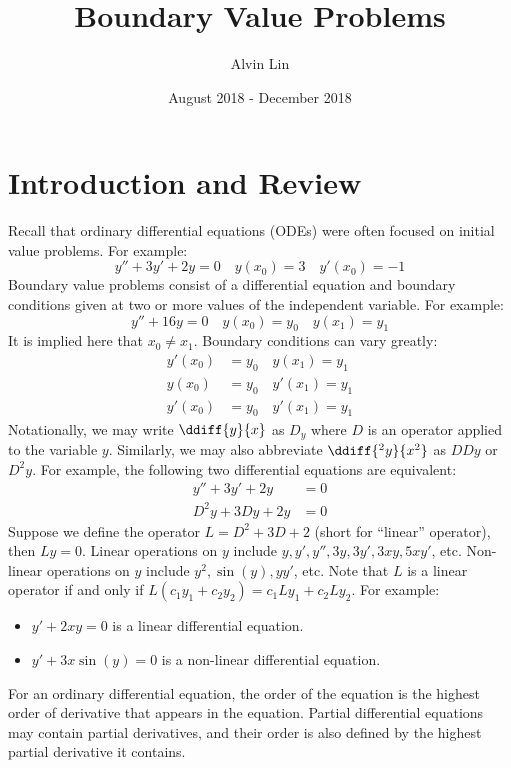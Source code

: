 \documentclass{math}
\title{Boundary Value Problems}
\author{Alvin Lin}
\date{August 2018 - December 2018}
\begin{document}
\maketitle

\section*{Introduction and Review}
Recall that ordinary differential equations (ODEs) were often focused on
initial value problems. For example:
\[ y''+3y'+2y = 0 \quad y(x_0) = 3 \quad y'(x_0) = -1 \]
Boundary value problems consist of a differential equation and boundary
conditions given at two or more values of the independent variable. For example:
\[ y''+16y = 0 \quad y(x_0) = y_0 \quad y(x_1) = y_1 \]
It is implied here that \( x_0 \ne x_1 \). Boundary conditions can vary greatly:
\begin{align*}
  y'(x_0) &= y_0 \quad y(x_1) = y_1 \\
  y(x_0) &= y_0 \quad y'(x_1) = y_1 \\
  y'(x_0) &= y_0 \quad y'(x_1) = y_1
\end{align*}
Notationally, we may write \( \ddiff{y}{x} \) as \( D_y \) where \( D \) is an
operator applied to the variable \( y \). Similarly, we may also abbreviate
\( \ddiff{^2y}{x^2} \) as \( DDy \) or \( D^2y \). For example, the following
two differential equations are equivalent:
\begin{align*}
  y''+3y'+2y &= 0 \\
  D^2y+3Dy+2y &= 0
\end{align*}
Suppose we define the operator \( L = D^2+3D+2 \) (short for ``linear''
operator), then \( Ly = 0 \). Linear operations on \( y \) include
\( y, y', y'', 3y, 3y', 3xy, 5xy' \), etc. Non-linear operations on \( y \)
include \( y^2, \sin(y), yy' \), etc. Note that \( L \) is a linear operator
if and only if \( L(c_1y_1+c_2y_2) = c_1Ly_1+c_2Ly_2 \). For example:
\begin{itemize}
  \item \( y'+2xy = 0 \) is a linear differential equation.
  \item \( y'+3x\sin(y) = 0 \) is a non-linear differential equation.
\end{itemize}
For an ordinary differential equation, the order of the equation is the highest
order of derivative that appears in the equation. Partial differential equations
may contain partial derivatives, and their order is also defined by the highest
partial derivative it contains. \par
\end{document}
